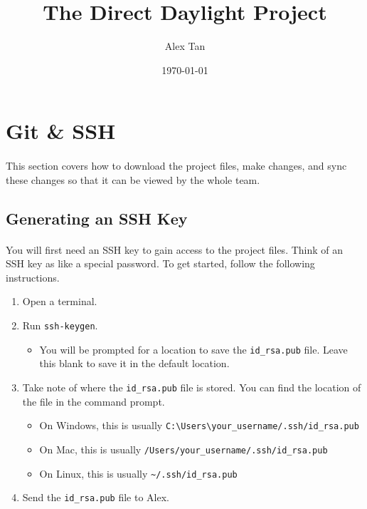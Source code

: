 \documentclass[11pt]{article}
\begin{document}
	
\begin{titlepage}
\title{The Direct Daylight Project}
\author{Alex Tan}
\date{\today}
\maketitle{}
\thispagestyle{empty}
\end{titlepage}

\tableofcontents
\thispagestyle{empty}
\clearpage

\setcounter{page}{1}

\section{Git \& SSH}
\paragraph{}
This section covers how to download the project files, make changes, and sync these changes so that it can be viewed by the whole team.
\subsection{Generating an SSH Key}
\paragraph{}
You will first need an SSH key to gain access to the project files. Think of an SSH key as like a special password. To get started, follow the following instructions.
\begin{enumerate}
\item Open a terminal.
\item Run \lstinline{ssh-keygen}.
\begin{itemize}
\item You will be prompted for a location to save the \lstinline{id_rsa.pub} file. Leave this blank to save it in the default location.
\end{itemize}
\item Take note of where the \lstinline{id_rsa.pub} file is stored. You can find the location of the file in the command prompt.
\begin{itemize}
\item On Windows, this is usually \lstinline{C:\Users\your_username/.ssh/id_rsa.pub}
\item On Mac, this is usually \lstinline{/Users/your_username/.ssh/id_rsa.pub}
\item On Linux, this is usually \lstinline{~/.ssh/id_rsa.pub}
\end{itemize}
\item Send the \lstinline{id_rsa.pub} file to Alex.
\end{enumerate}
\end{document}
